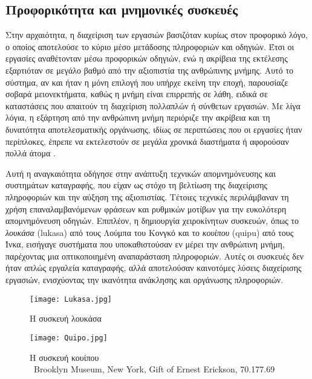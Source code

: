         \subsection{Προφορικότητα και μνημονικές συσκευές}
            Στην αρχαιότητα, η διαχείριση των εργασιών βασιζόταν κυρίως στον προφορικό λόγο, ο οποίος αποτελούσε το κύριο μέσο μετάδοσης πληροφοριών και οδηγιών. Έτσι οι εργασίες αναθέτονταν μέσω προφορικών οδηγιών, ενώ η ακρίβεια της εκτέλεσης εξαρτιόταν σε μεγάλο βαθμό από την αξιοπιστία της ανθρώπινης μνήμης. Αυτό το σύστημα, αν και ήταν η μόνη επιλογή που υπήρχε εκείνη την εποχή, παρουσίαζε σοβαρά μειονεκτήματα, καθώς η μνήμη είναι επιρρεπής σε λάθη, ειδικά σε καταστάσεις που απαιτούν τη διαχείριση πολλαπλών ή σύνθετων εργασιών. Με λίγα λόγια, η εξάρτηση από την ανθρώπινη μνήμη περιόριζε την ακρίβεια και τη δυνατότητα αποτελεσματικής οργάνωσης, ιδίως σε περιπτώσεις που οι εργασίες ήταν περίπλοκες, έπρεπε να εκτελεστούν σε μεγάλα χρονικά διαστήματα ή αφορούσαν πολλά άτομα \cite{Goody2013}.

            Αυτή η αναγκαιότητα οδήγησε στην ανάπτυξη τεχνικών απομνημόνευσης και συστημάτων καταγραφής, που είχαν ως στόχο τη βελτίωση της διαχείρισης πληροφοριών και την αύξηση της αξιοπιστίας. Τέτοιες τεχνικές περιλάμβαναν τη χρήση επαναλαμβανόμενων φράσεων και ρυθμικών μοτίβων για την ευκολότερη απομνημόνευση οδηγιών. Επιπλέον, η δημιουργία χειροκίνητων συσκευών, όπως το \textit{λουκάσα} (lukasa) από τους Λούμπα του Κονγκό και το \textit{κουίπου} (quipu) από τους Ίνκα, εισήγαγε συστήματα που υποκαθιστούσαν εν μέρει την ανθρώπινη μνήμη, παρέχοντας μια οπτικοποιημένη αναπαράσταση πληροφοριών. Αυτές οι συσκευές δεν ήταν απλώς εργαλεία καταγραφής, αλλά αποτελούσαν καινοτόμες λύσεις διαχείρισης εργασιών, ενισχύοντας την ικανότητα ανάκλησης και οργάνωσης πληροφοριών.

            \begin{figure}[h!] \noindent \centering
                \texttt{[image: Lukasa.jpg]}
                \caption{Η συσκευή λουκάσα \cite{Lukasa}}
                \label{fig:Lukasa}
            \end{figure}

            \begin{figure}[h!] \noindent \centering
                \texttt{[image: Quipo.jpg]}
                \caption{\centering Η συσκευή κουίπου \\ {\footnotesize \textcopyright\ Brooklyn Museum, New York, Gift of Ernest Erickson, 70.177.69}}
                \label{fig:Quipo}
            \end{figure}

